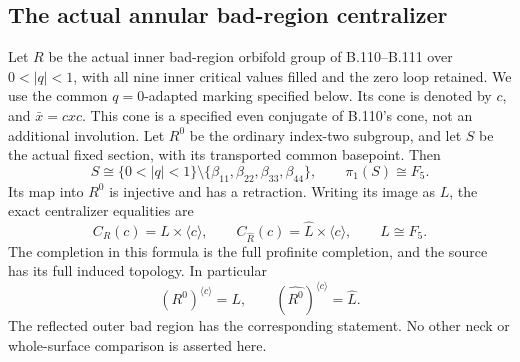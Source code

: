 \subsection*{The actual annular bad-region centralizer}

\label{stmt:B112}
Let $R$ be the actual inner bad-region orbifold group of B.110--B.111
over $0<|q|<1$, with all nine inner critical values filled and the
zero loop retained. We use the common $q=0$-adapted marking specified
below. Its cone is denoted by $c$, and $\bar x=cxc$. This cone is a
specified even conjugate of B.110's cone, not an additional involution.
Let $R^0$ be the ordinary index-two subgroup, and let $S$ be the actual
fixed section, with its transported common basepoint. Then
\[
 S\cong\{0<|q|<1\}\setminus
       \{\beta_{11},\beta_{22},\beta_{33},\beta_{44}\},
 \qquad \pi_1(S)\cong F_5.
\]
Its map into $R^0$ is injective and has a retraction. Writing its
image as $L$, the exact centralizer equalities are
\begin{equation}\label{eq:B112-main}
 C_R(c)=L\times\langle c\rangle,
 \qquad C_{\widehat R}(c)=\widehat L\times\langle c\rangle,
 \qquad L\cong F_5.
\end{equation}
The completion in this formula is the full profinite completion, and
the source has its full induced topology. In particular
\[
 (R^0)^{\langle c\rangle}=L,
 \qquad (\widehat{R^0})^{\langle c\rangle}=\widehat L.
\]
The reflected outer bad region has the corresponding statement.
No other neck or whole-surface comparison is asserted here.

